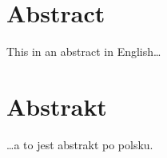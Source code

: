\section*{Abstract}\label{sec:abstract}

 This in an abstract in English\ldots

\section*{Abstrakt}\label{sec:abstrakt}

\ldots a to jest abstrakt po polsku.